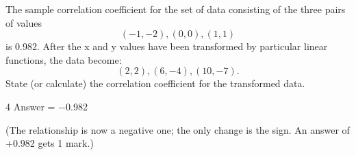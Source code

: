 \documentclass[a4paper,12pt]{article}
\begin{document}
The sample correlation coefficient for the set of data consisting of the three pairs of
values
\[(−1,−2) , (0,0) , (1,1)\]
is 0.982. After the x and y values have been transformed by particular linear functions,
the data become:
\[(2,2) , (6,−4) , (10,−7).\]
State (or calculate) the correlation coefficient for the transformed data.

4
Answer = −0.982

(The relationship is now a negative one; the only change is the sign. An answer of
+0.982 gets 1 mark.)
\end{document}
